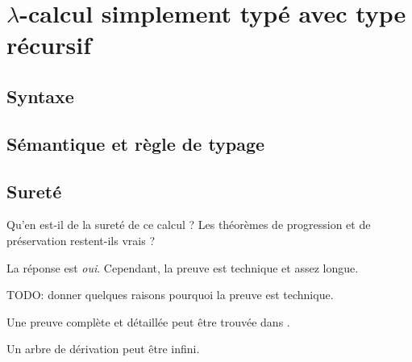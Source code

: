 \chapter{$\lambda$-calcul simplement typé avec type récursif}

\section{Syntaxe}

\section{Sémantique et règle de typage}

\section{Sureté}

Qu'en est-il de la sureté de ce calcul ? Les théorèmes de progression et de
préservation restent-ils vrais ?

La réponse est \textit{oui}. Cependant, la preuve est technique et assez longue.

TODO: donner quelques raisons pourquoi la preuve est technique.

Une preuve complète et détaillée peut être trouvée dans \cite{tapl-recursive-type-metatheory}.

Un arbre de dérivation peut être infini.